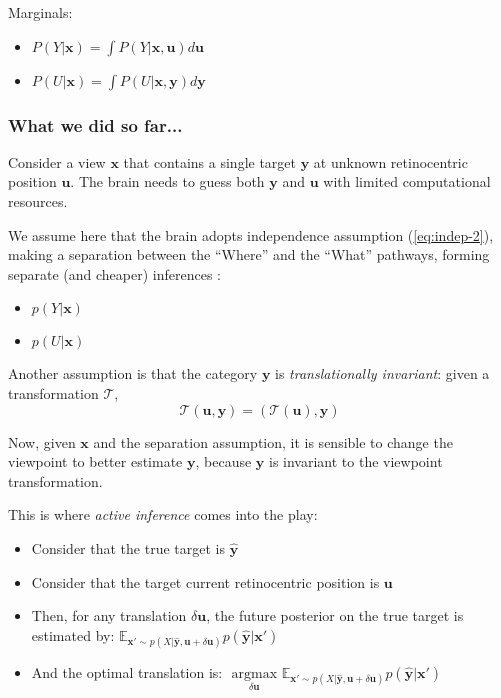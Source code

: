 Marginals:
\begin{itemize}
\item $ P(Y|\boldsymbol{x}) = \int P(Y|\boldsymbol{x}, \boldsymbol{u}) d\boldsymbol{u}$
\item $ P(U|\boldsymbol{x}) = \int P(U|\boldsymbol{x}, \boldsymbol{y}) d\boldsymbol{y}$
\end{itemize}

\subsubsection{What we did so far...}

Consider a view $\boldsymbol{x}$ that contains a single target $\boldsymbol{y}$ at unknown retinocentric position $\boldsymbol{u}$. The brain needs to guess both  $\boldsymbol{y}$ and $\boldsymbol{u}$ with limited computational resources. 
   
We assume here that the brain adopts independence assumption (\ref{eq:indep-2}), making a separation between the ``Where'' and the ``What'' pathways, forming separate (and cheaper) inferences :
\begin{itemize}
\item $p(Y|\boldsymbol{x})$
\item $p(U|\boldsymbol{x})$
\end{itemize}

Another assumption is that the category $\boldsymbol{y}$ is \emph{translationally invariant}: given a transformation $\mathcal{T}$,
$$\mathcal{T}(\boldsymbol{u}, \boldsymbol{y}) 
= (\mathcal{T}(\boldsymbol{u}), \boldsymbol{y})$$

Now, given $\boldsymbol{x}$ and the separation assumption, it is sensible to change the viewpoint to better estimate $\boldsymbol{y}$, because  $\boldsymbol{y}$ is invariant to the viewpoint transformation.

This is where \emph{active inference} comes into the play:
\begin{itemize}
\item Consider that the true target is $\hat{\boldsymbol{y}}$
\item Consider that the target current retinocentric position is $\boldsymbol{u}$
\item Then, for any translation $\delta \boldsymbol{u}$, the future posterior on the true target is estimated by:
$\mathbb{E}_{\boldsymbol{x}'\sim p(X|\hat{\boldsymbol{y}}, \boldsymbol{u}+\delta \boldsymbol{u})} p(\hat{\boldsymbol{y}}|\boldsymbol{x}')$
\item And the optimal translation is:  $\underset{\delta\boldsymbol{u}}{\text{ argmax }}  \mathbb{E}_{\boldsymbol{x}'\sim p(X|\hat{\boldsymbol{y}}, \boldsymbol{u}+\delta \boldsymbol{u})} p(\hat{\boldsymbol{y}}|\boldsymbol{x}')$
\end{itemize}

